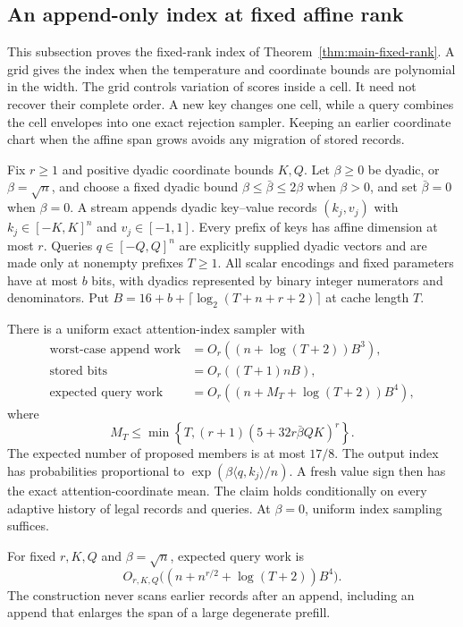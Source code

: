 \subsection{An append-only index at fixed affine rank}
\label{sec:dynamicfixedrank}

This subsection proves the fixed-rank index of
Theorem~\ref{thm:main-fixed-rank}.  A grid gives the index when the
temperature and coordinate bounds are polynomial in the width.
The grid controls variation of scores inside a cell.  It need not
recover their complete order.  A new key changes one cell, while
a query combines the cell envelopes into one exact rejection
sampler.  Keeping an earlier coordinate chart when the affine
span grows avoids any migration of stored records.

\begin{theorem}
\label{thm:dynamicfixedrank}
Fix $r\ge1$ and positive dyadic coordinate bounds $K,Q$.
Let $\beta\ge0$ be dyadic, or $\beta=\sqrt n$, and choose a
fixed dyadic bound $\beta\le\bar\beta\le2\beta$ when
$\beta>0$, and set $\bar\beta=0$ when $\beta=0$.
A stream appends dyadic key--value records
$(k_j,v_j)$ with $k_j\in[-K,K]^n$ and $v_j\in[-1,1]$.
Every prefix of keys has affine dimension at most $r$.
Queries $q\in[-Q,Q]^n$ are explicitly supplied dyadic vectors
and are made only at nonempty prefixes $T\ge1$.
All scalar encodings and fixed parameters have at most $b$ bits,
with dyadics represented by binary integer numerators and
denominators.
Put $B=16+b+\lceil\log_2(T+n+r+2)\rceil$ at cache length $T$.

There is a uniform exact attention-index sampler with
\[
 \begin{split}
 \text{worst-case append work}
     &=O_r((n+\log(T+2))B^3),\\
 \text{stored bits}&=O_r((T+1)nB),\\
 \text{expected query work}
     &=O_r((n+M_T+\log(T+2))B^4),
 \end{split}
\]
where
\[
 M_T\le\min\left\{T,
        (r+1)(5+32r\bar\beta QK)^r\right\}.
\]
The expected number of proposed members is at most $17/8$.
The output index has probabilities proportional to
$\exp(\beta\langle q,k_j\rangle/n)$.  A fresh value sign then
has the exact attention-coordinate mean.  The claim holds
conditionally on every adaptive history of legal records and
queries.  At $\beta=0$, uniform index sampling suffices.

For fixed $r,K,Q$ and $\beta=\sqrt n$, expected query work is
\[
 O_{r,K,Q}\bigl((n+n^{r/2}+\log(T+2))B^4\bigr).
\]
The construction never scans earlier records after an append,
including an append that enlarges the span of a large degenerate
prefill.
\end{theorem}


